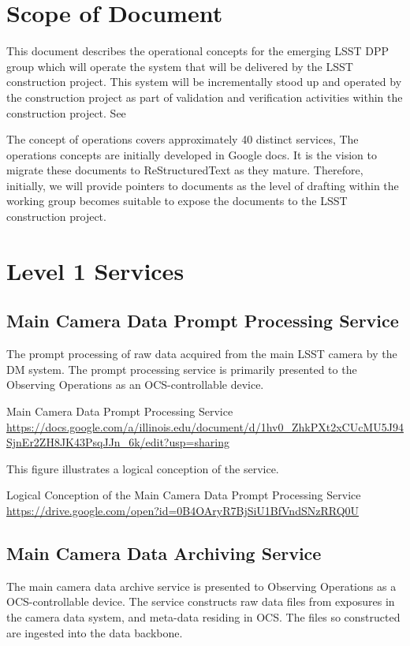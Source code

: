 \section{Scope of Document}


This document describes the operational concepts for the emerging LSST DPP group which will operate
the system that will be delivered by the LSST construction project. This system will be incrementally
stood up and operated by the construction project as part of validation and verification activities
within the construction project. See 

The concept of operations covers approximately 40 distinct services, The operations concepts
are initially developed in Google docs. It is the vision to  migrate these documents to
ReStructuredText as they mature.  Therefore, initially, we will provide pointers to documents as
the level of drafting within the working group becomes suitable to expose the documents to the
LSST construction project.


\section{ Level 1 Services}

\subsection{Main Camera Data Prompt Processing Service}

The prompt processing of raw data acquired from the main LSST camera
by the DM system. The prompt processing service is primarily presented
to the Observing Operations as an OCS-controllable device.

Main Camera Data Prompt Processing Service  \url{https://docs.google.com/a/illinois.edu/document/d/1hv0_ZhkPXt2xCUcMU5J94SjnEr2ZH8JK43PsqJJn_6k/edit?usp=sharing}

This figure illustrates a logical conception of the service.

Logical Conception of the Main Camera Data Prompt Processing Service  \url{https://drive.google.com/open?id=0B4OAryR7BjSiU1BfVndSNzRRQ0U}



\subsection{Main Camera Data Archiving Service}

The main camera data archive service is presented to Observing
Operations as a OCS-controllable device.  The service constructs raw
data files from exposures in the camera data system, and meta-data
residing in OCS.  The files so constructed are ingested into the data
backbone.

